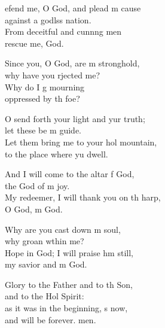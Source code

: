 \settowidth{\versewidth}{My redeemer, I will thank you on the harp, *}
\begin{psalmverse}%
  \begin{patverse}
    efend me, O God, and plead m cause\Med\\
against a godlss nation.\\
From deceitful and cunn\pointup{\i}ng men\Med\\
rescue me,  God.

Since you, O God, are m stronghold,\Med\\
why have you rjected me?\\
Why do I g mourning\Med\\
oppressed by th foe?

O send forth your light and yur truth;\Med\\
let these be m guide.\\
Let them bring me to your hol mountain,\Med\\
to the place where yu dwell.

And I will come to the altar f God,\Med\\
the God of m joy.\\
My redeemer, I will thank you on th harp,\Med\\
O God, m God.

Why are you cast down m soul,\Med\\
why groan w\pointup{\i}thin me?\\
Hope in God; I will praise h\pointup{\i}m still,\Med\\
my savior and m God.

Glory to the Father and to th Son,\Med\\
and to the Hol Spirit:\\
as it was in the beginning, \pointup{\i}s now,\Med\\
and will be forever. men.
  \end{patverse}
\end{psalmverse}
